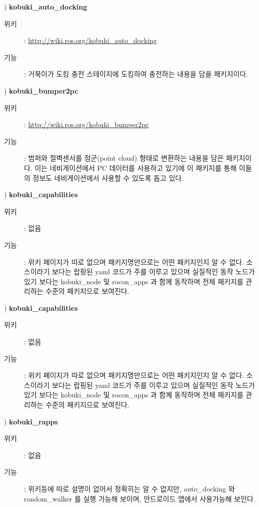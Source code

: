 \vspace{\baselineskip}
\noindent{}
\thenum) \textbf{kobuki\_auto\_docking}
\begin{description}
\item[위키]: \url{http://wiki.ros.org/kobuki_auto_docking}
\item[기능]: 거북이가 도킹 충전 스테이지에 도킹하여 충전하는 내용을 담을 패키지이다.
\end{description}

\vspace{\baselineskip}
\noindent{}
\thenum) \textbf{kobuki\_bumper2pc}
\begin{description}
\item[위키]: \url{http://wiki.ros.org/kobuki_bumper2pc}
\item[기능]: 범퍼와 절벽센서를 점군(point cloud) 형태로 변환하는 내용을 담은 패키지이다. 이는 네비게이션에서 PC 데이터를 사용하고 있기에 이 패키지를 통해 이들의 정보도 네비게이션에서 사용할 수 있도록 돕고 있다.
\end{description}

\vspace{\baselineskip}
\noindent{}
\thenum) \textbf{kobuki\_capabilities}
\begin{description}
\item[위키]: 없음
\item[기능]: 위키 페이지가 따로 없으며 패키지명만으로는 어떤 패키지인지 알 수 없다. 소스이라기 보다는 랍핑된 yaml 코드가 주를 이루고 있으며 실질적인 동작 노드가 있기 보다는 kobuki\_node 및 rocon\_apps 과 함께 동작하며 전체 패키지를 관리하는 수준의 패키지으로 보여진다.
\end{description}

\vspace{\baselineskip}
\noindent{}
\thenum) \textbf{kobuki\_capabilities}
\begin{description}
\item[위키]: 없음
\item[기능]: 위키 페이지가 따로 없으며 패키지명만으로는 어떤 패키지인지 알 수 없다. 소스이라기 보다는 랍핑된 yaml 코드가 주를 이루고 있으며 실질적인 동작 노드가 있기 보다는 kobuki\_node 및 rocon\_apps 과 함께 동작하며 전체 패키지를 관리하는 수준의 패키지으로 보여진다.
\end{description}

\vspace{\baselineskip}
\noindent{}
\thenum) \textbf{kobuki\_rapps}
\begin{description}
\item[위키]: 없음
\item[기능]: 위키등에 따로 설명이 없어서 정확히는 알 수 없지만, auto\_docking 와 random\_walker 를 실행 가능해 보이며, 안드로이드 앱에서 사용가능해 보인다.
\end{description}


